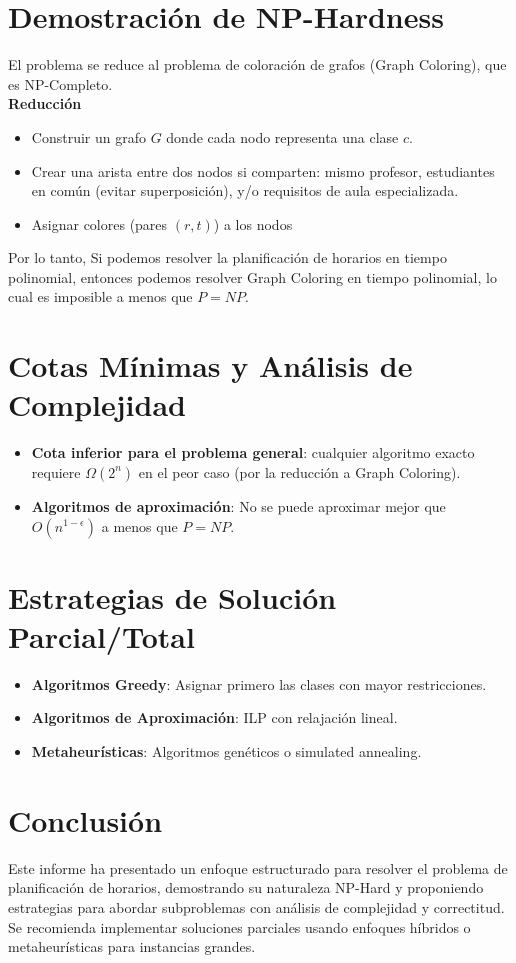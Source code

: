 \documentclass[12pt, a4paper]{article}
\begin{document}
\section{Demostración de NP-Hardness}
El problema se reduce al problema de coloración de grafos (Graph Coloring), que es NP-Completo.\\
\textbf{Reducción}
\begin{itemize}
    \item Construir un grafo $G$ donde cada nodo representa una clase $c$.
    \item Crear una arista entre dos nodos si comparten: mismo profesor, estudiantes en común (evitar superposición), y/o requisitos de aula especializada.
    \item Asignar colores (pares $(r,t)$) a los nodos
\end{itemize}
Por lo tanto, Si podemos resolver la planificación de horarios en tiempo polinomial, entonces podemos resolver Graph Coloring en tiempo polinomial, lo cual es imposible a menos que $P = NP$.

\section{Cotas Mínimas y Análisis de Complejidad}
\begin{itemize}
    \item \textbf{Cota inferior para el problema general}: cualquier algoritmo exacto requiere \( \Omega(2^n) \) en el peor caso (por la reducción a Graph Coloring).
    \item \textbf{Algoritmos de aproximación}: No se puede aproximar mejor que \( O(n^{1-\epsilon}) \) a menos que \( P = NP \).
\end{itemize}

\section{Estrategias de Solución Parcial/Total}
\begin{itemize}
    \item \textbf{Algoritmos Greedy}: Asignar primero las clases con mayor restricciones.
    \item \textbf{Algoritmos de Aproximación}: ILP con relajación lineal.
    \item \textbf{Metaheurísticas}: Algoritmos genéticos o simulated annealing.
\end{itemize}

\section{Conclusión}
Este informe ha presentado un enfoque estructurado para resolver el problema de planificación de horarios, demostrando su naturaleza NP-Hard y proponiendo estrategias para abordar subproblemas con análisis de complejidad y correctitud. Se recomienda implementar soluciones parciales usando enfoques híbridos o metaheurísticas para instancias grandes.
\end{document}
